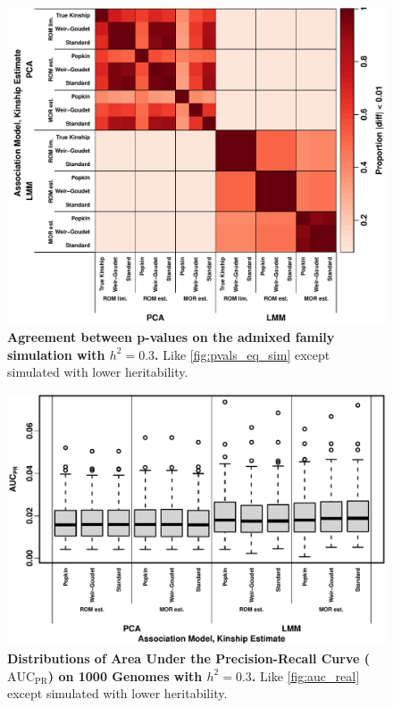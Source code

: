\documentclass[11pt]{article}
\newcommand{\auc}{\text{AUC}_\text{PR}}
\begin{document}
\begin{figure}[bp!]
  \centering
  \includegraphics[width=\textwidth]{sim-admix-n1000-m100000-k3-f0.3-s0.5-g20/h-0.3/pvals_eq.pdf}
  \caption{
    {\bf Agreement between p-values on the admixed family simulation with $h^2=0.3$.}
    Like \cref{fig:pvals_eq_sim} except simulated with lower heritability.
    }
  \label{fig:pvals_eq_sim-h3}
\end{figure}

\begin{figure}[bp!]
  \centering
  \includegraphics[width=\textwidth]{tgp-nygc-autosomes_ld_prune_1000kb_0.3_maf-0.01/h-0.3/auc.pdf}
  \caption{
    {\bf Distributions of Area Under the Precision-Recall Curve ($\auc$) on 1000 Genomes with $h^2=0.3$.}
    Like \cref{fig:auc_real} except simulated with lower heritability.
  }
  \label{fig:auc_real-h3}
\end{figure}
\end{document}
